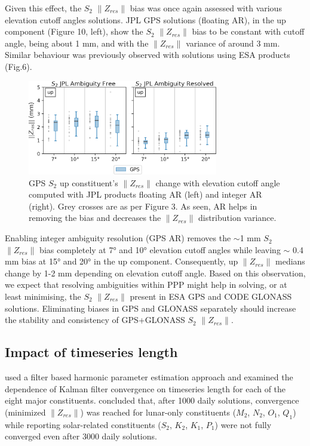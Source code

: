 \documentclass[se, manuscript]{copernicus}
\begin{document}
Given this effect, the $S_2$ $\|Z_{res}\|$ bias was once again assessed with various elevation cutoff angles solutions. JPL GPS solutions (floating AR), in the up component (Figure 10, left), show the $S_2$ $\|Z_{res}\|$ bias to be constant with cutoff angle, being about 1 mm, and with the $\|Z_{res}\|$ variance of around 3 mm. Similar behaviour was previously observed with solutions using ESA products (Fig.6).

\begin{figure}[t]
\includegraphics[width=8.3cm]{fig10.png}
\caption{GPS $S_2$ up constituent’s $\|Z_{res}\|$ change with elevation cutoff angle computed with JPL products floating AR (left) and integer AR (right). Grey crosses are as per Figure 3. As seen, AR helps in removing the bias and  decreases the $\|Z_{res}\|$ distribution variance.}
\end{figure}

Enabling integer ambiguity resolution (GPS AR) removes the $\sim$1 mm $S_2$ $\|Z_{res}\|$ bias completely at 7° and 10° elevation cutoff angles while leaving $\sim$ 0.4 mm bias at 15° and 20° in the up component. Consequently, up $\|Z_{res}\|$ medians change by 1-2 mm depending on elevation cutoff angle. Based on this observation, we expect that resolving ambiguities within PPP might help in solving, or at least minimising, the $S_2$ $\|Z_{res}\|$ present in ESA GPS and CODE GLONASS solutions. Eliminating biases in GPS and GLONASS separately should increase the stability and consistency of GPS+GLONASS $S_2$ $\|Z_{res}\|$.

\subsection{Impact of timeseries length}
\cite{Yuan2013} used a filter based harmonic parameter estimation approach and examined the dependence of Kalman filter convergence on timeseries length for each of the eight major constituents. \cite{Yuan2013} concluded that, after 1000 daily solutions, convergence (minimized $\|Z_{res}\|$) was reached for lunar-only constituents ($M_2$, $N_2$, $O_1$, $Q_1$) while reporting solar-related constituents ($S_2$, $K_2$, $K_1$, $P_1$) were not fully converged even after 3000 daily solutions.
\end{document}

